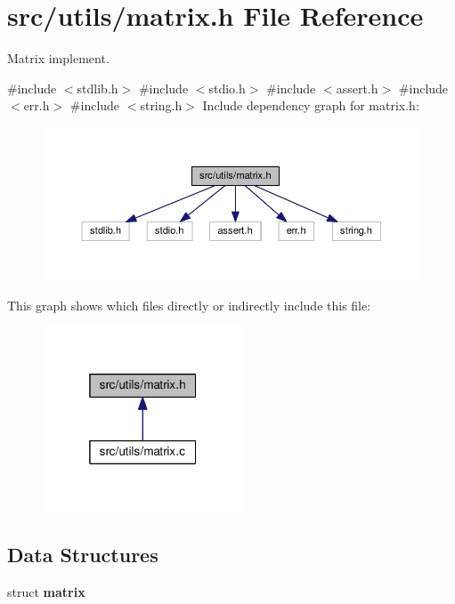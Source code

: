 \section{src/utils/matrix.h File Reference}
\label{matrix_8h}


Matrix implement.  


{\ttfamily \#include $<$stdlib.\+h$>$}\newline
{\ttfamily \#include $<$stdio.\+h$>$}\newline
{\ttfamily \#include $<$assert.\+h$>$}\newline
{\ttfamily \#include $<$err.\+h$>$}\newline
{\ttfamily \#include $<$string.\+h$>$}\newline
Include dependency graph for matrix.\+h\+:\nopagebreak
\begin{figure}[H]
\begin{center}
\leavevmode
\includegraphics[width=350pt]{matrix_8h__incl}
\end{center}
\end{figure}
This graph shows which files directly or indirectly include this file\+:\nopagebreak
\begin{figure}[H]
\begin{center}
\leavevmode
\includegraphics[width=169pt]{matrix_8h__dep__incl}
\end{center}
\end{figure}
\subsection*{Data Structures}
\begin{DoxyCompactItemize}
\item 
struct \textbf{ matrix}
\end{DoxyCompactItemize}
